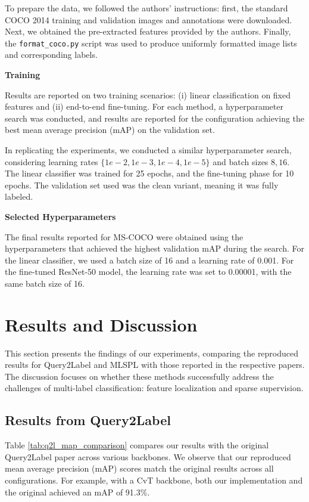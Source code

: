 \documentclass[lettersize,journal]{IEEEtran}
\renewcommand{\paragraph}[1]{%
  \vspace{1.5ex}\textbf{#1}\quad
}
\begin{document}
To prepare the data, we followed the authors' instructions: first, the standard COCO 2014 training and validation images and annotations were downloaded. Next, we obtained the pre-extracted features provided by the authors. Finally, the \texttt{format\_coco.py} script was used to produce uniformly formatted image lists and corresponding labels.


\paragraph{Training}
Results are reported on two training scenarios: (i) linear classification on fixed features and (ii) end-to-end fine-tuning. For each method, a hyperparameter search was conducted, and results are reported for the configuration achieving the best mean average precision (mAP) on the validation set.

In replicating the experiments, we conducted a similar hyperparameter search, considering learning rates  $\{1e-2, 1e-3, 1e-4, 1e-5\}$ and batch sizes ${8, 16}$. The linear classifier was trained for 25 epochs, and the fine-tuning phase for 10 epochs. The validation set used was the clean variant, meaning it was fully labeled.

\paragraph{Selected Hyperparameters}
The final results reported for MS-COCO were obtained using the hyperparameters that achieved the highest validation mAP during the search. For the linear classifier, we used a batch size of 16 and a learning rate of 0.001. For the fine-tuned ResNet-50 model, the learning rate was set to 0.00001, with the same batch size of 16.


\section{Results and Discussion}
\label{sec:results}
This section presents the findings of our experiments, comparing the reproduced results for Query2Label and MLSPL with those reported in the respective papers. The discussion focuses on whether these methods successfully address the challenges of multi-label classification: feature localization and sparse supervision.



\subsection{Results from Query2Label}
Table \ref{tab:q2l_map_comparison} compares our results with the original Query2Label paper across various backbones. We observe that our reproduced mean average precision (mAP) scores match the original results across all configurations. For example, with a CvT backbone, both our implementation and the original achieved an mAP of 91.3\%.
\end{document}
